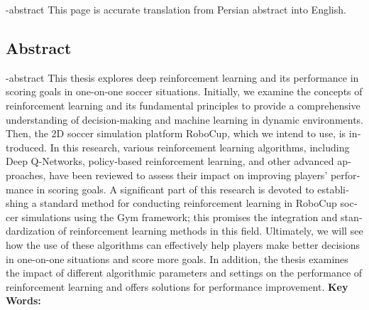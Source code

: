 
\en-abstract{
This page is accurate translation from Persian abstract into English.
}

\newpage
\thispagestyle{empty}
\begin{latin}
\section*{\LARGE\centering Abstract}

\een-abstract
This thesis explores deep reinforcement learning and its performance in scoring goals in one-on-one soccer situations. Initially, we examine the concepts of reinforcement learning and its fundamental principles to provide a comprehensive understanding of decision-making and machine learning in dynamic environments. Then, the 2D soccer simulation platform RoboCup, which we intend to use, is introduced. In this research, various reinforcement learning algorithms, including Deep Q-Networks, policy-based reinforcement learning, and other advanced approaches, have been reviewed to assess their impact on improving players' performance in scoring goals. A significant part of this research is devoted to establishing a standard method for conducting reinforcement learning in RoboCup soccer simulations using the Gym framework; this promises the integration and standardization of reinforcement learning methods in this field. Ultimately, we will see how the use of these algorithms can effectively help players make better decisions in one-on-one situations and score more goals. In addition, the thesis examines the impact of different algorithmic parameters and settings on the performance of reinforcement learning and offers solutions for performance improvement.
\vspace*{.5cm}
{\large\textbf{Key Words:}}\par
\vspace*{.5cm}
\elatinkeywords
\end{latin}